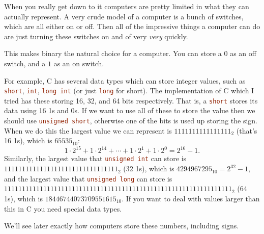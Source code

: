 \documentclass[fleqn]{LectureClass/LectureClass}
\begin{document}
    \begin{app}{}{}
        When you really get down to it computers are pretty limited in what they can actually represent.
        A very crude model of a computer is a bunch of switches, which are all either on or off.
        Then all of the impressive things a computer can do are just turning these switches on and of very \emph{very} quickly.
        
        This makes binary the natural choice for a computer.
        You can store a \(0\) as an off switch, and a \(1\) as an on switch.
        
        For example, C has several data types which can store integer values, such as \lstinline[language=C]|short|, \lstinline[language=C]|int|, \lstinline[language=C]|long int| (or just \lstinline[language=C]|long| for short).
        The implementation of C which I tried has these storing 16, 32, and 64 bits respectively.
        That is, a \lstinline[language=C]|short| stores its data using 16 1s and 0s.
        If we want to use all of these to store the value then we should use \lstinline[language=C]|unsigned short|, otherwise one of the bits is used up storing the sign.
        When we do this the largest value we can represent is \(1111111111111111_2\) (that's 16 1s), which is \(\num{65535}_{10}\):
        \begin{equation}
            1 \cdot 2^{15} + 1 \cdot 2^{14} + \dotsb + 1 \cdot 2^1 + 1 \cdot 2^0 = 2^{16} - 1.
        \end{equation}
        Similarly, the largest value that \lstinline[language=C]|unsigned int| can store is \(11111111111111111111111111111111_2\) (32 1s), which is \(\num{4294967295}_{10} = 2^{32} - 1\), and the largest value that \lstinline[language=C]|unsigned long| can store is {\small\(1111111111111111111111111111111111111111111111111111111111111111_2\)} (64 1s), which is \(\num{18446744073709551615}_{10}\).
        If you want to deal with values larger than this in C you need special data types.
        
        We'll see later exactly how computers store these numbers, including signs.
    \end{app}
    
\end{document}
